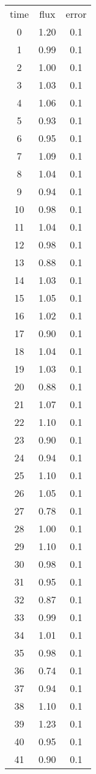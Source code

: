 \begin{table}
\begin{tabular}{ccc}
time & flux & error \\
0 & 1.20 & 0.1 \\
1 & 0.99 & 0.1 \\
2 & 1.00 & 0.1 \\
3 & 1.03 & 0.1 \\
4 & 1.06 & 0.1 \\
5 & 0.93 & 0.1 \\
6 & 0.95 & 0.1 \\
7 & 1.09 & 0.1 \\
8 & 1.04 & 0.1 \\
9 & 0.94 & 0.1 \\
10 & 0.98 & 0.1 \\
11 & 1.04 & 0.1 \\
12 & 0.98 & 0.1 \\
13 & 0.88 & 0.1 \\
14 & 1.03 & 0.1 \\
15 & 1.05 & 0.1 \\
16 & 1.02 & 0.1 \\
17 & 0.90 & 0.1 \\
18 & 1.04 & 0.1 \\
19 & 1.03 & 0.1 \\
20 & 0.88 & 0.1 \\
21 & 1.07 & 0.1 \\
22 & 1.10 & 0.1 \\
23 & 0.90 & 0.1 \\
24 & 0.94 & 0.1 \\
25 & 1.10 & 0.1 \\
26 & 1.05 & 0.1 \\
27 & 0.78 & 0.1 \\
28 & 1.00 & 0.1 \\
29 & 1.10 & 0.1 \\
30 & 0.98 & 0.1 \\
31 & 0.95 & 0.1 \\
32 & 0.87 & 0.1 \\
33 & 0.99 & 0.1 \\
34 & 1.01 & 0.1 \\
35 & 0.98 & 0.1 \\
36 & 0.74 & 0.1 \\
37 & 0.94 & 0.1 \\
38 & 1.10 & 0.1 \\
39 & 1.23 & 0.1 \\
40 & 0.95 & 0.1 \\
41 & 0.90 & 0.1 \\

\end{tabular}
\end{table}
